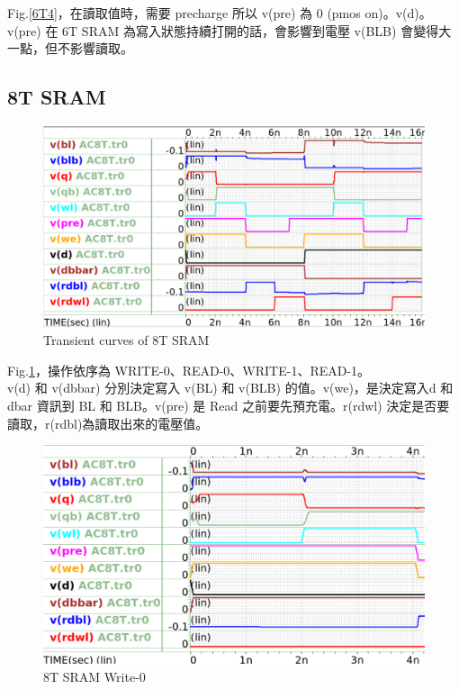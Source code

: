 \documentclass{article}
\begin{document}
Fig.\ref{6T4}，在讀取值時，需要 precharge 所以 v(pre) 為 0 (pmos on)。v(d)。 v(pre) 在 6T SRAM 為寫入狀態持續打開的話，會影響到電壓 v(BLB) 會變得大一點，但不影響讀取。




\subsection{8T SRAM}

\begin{figure}[H]
\centering
\includegraphics[width=\linewidth]{./img/2023-11-16-13-30-04.png}
\caption{Transient curves of 8T SRAM}
\label{tran8T}
\end{figure}

Fig.\ref{tran8T}，操作依序為 WRITE-0、READ-0、WRITE-1、READ-1。\\
v(d) 和 v(dbbar) 分別決定寫入 v(BL) 和 v(BLB) 的值。v(we)，是決定寫入d 和 dbar 資訊到 BL 和 BLB。v(pre) 是 Read 之前要先預充電。r(rdwl) 決定是否要讀取，r(rdbl)為讀取出來的電壓值。

\begin{figure}[H]
\centering
\includegraphics[width=0.7\linewidth]{./img/2023-11-16-13-35-03.png}
\caption{8T SRAM Write-0}
\label{8T1}
\end{figure}

\vspace*{-1em}
\end{document}
